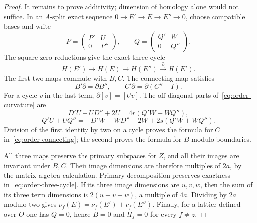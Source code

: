 \begin{proof}
It remains to prove additivity; dimension of homology alone would not
suffice.  In an $A$-split exact sequence
$0\to E'\to E\to E''\to0$, choose compatible bases and write
\[
 P=\begin{pmatrix}P'&U\\0&P''\end{pmatrix},\qquad
 Q=\begin{pmatrix}Q'&W\\0&Q''\end{pmatrix}.
\]
The square-zero reductions give the exact three-cycle
\begin{equation}\label{eq:order-three-cycle}
 H(E')\longrightarrow H(E)\longrightarrow H(E'')
       \xrightarrow{\partial}H(E').
\end{equation}
The first two maps commute with $B,C$.  The connecting map satisfies
\begin{equation}\label{eq:order-connecting}
 B'\partial=\partial B'',\qquad
 C'\partial=\partial(C''+I).
\end{equation}
For a cycle $v$ in the last term, $\partial[v]=[Uv]$.  The off-diagonal
parts of~\eqref{eq:order-curvature} are
\[
 D'U+UD''+2U=4r(Q'W+WQ''),
 \]
 \[
 Q'U+UQ''=-D'W-WD''-2W+2s(Q'W+WQ'').
\]
Division of the first identity by two on a cycle proves the formula
for $C$ in~\eqref{eq:order-connecting}; the second proves the formula
for $B$ modulo boundaries.

All three maps preserve the primary subspaces for $Z$, and all their
images are invariant under $B,C$.  Their image dimensions are therefore
multiples of $2a$, by the matrix-algebra calculation.  Primary
decomposition preserves exactness in~\eqref{eq:order-three-cycle}.
If its three image dimensions are $u,v,w$, then the sum of its three
term dimensions is $2(u+v+w)$, a multiple of $4a$.
Dividing by $2a$ modulo two gives
$\nu_f(E)=\nu_f(E')+\nu_f(E'')$.
Finally, for a lattice defined over $O$ one has $Q=0$, hence $B=0$ and
$H_f=0$ for every $f\ne z$.
\end{proof}

